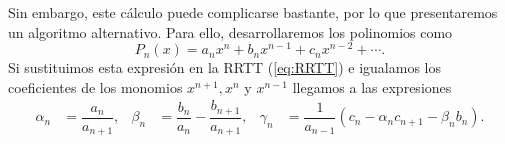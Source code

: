 
Sin embargo, este cálculo puede complicarse bastante, por lo que presentaremos un algoritmo alternativo. Para ello, desarrollaremos los polinomios como
$$
P_n(x) = a_n x^n + b_n x^{n-1} + c_n x^{n-2} + \cdots.
$$
Si sustituimos esta expresión en la RRTT (\ref{eq:RRTT}) e igualamos los coeficientes de los monomios $x^{n+1}, x^n$ y $x^{n-1}$ llegamos a las expresiones
\begin{align}
    \label{eq:ctes-RRTT2}
    \alpha_n &= \dfrac{a_n}{a_{n+1}}, & \beta_n &= \dfrac{b_n}{a_n}-\dfrac{b_{n+1}}{a_{n+1}}, & \gamma_n &= \dfrac{1}{a_{n-1}}\left(c_n - \alpha_n c_{n+1} - \beta_n b_n\right).
\end{align}



